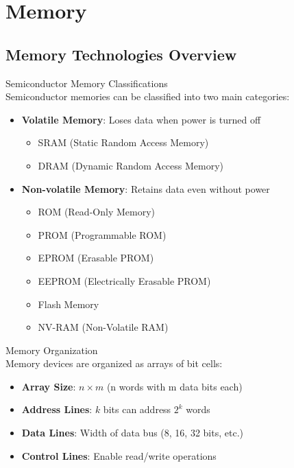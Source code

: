 \section{Memory}

\subsection{Memory Technologies Overview}

\begin{concept}{Semiconductor Memory Classifications}\\
Semiconductor memories can be classified into two main categories:
\begin{itemize}
    \item \textbf{Volatile Memory}: Loses data when power is turned off
    \begin{itemize}
        \item SRAM (Static Random Access Memory)
        \item DRAM (Dynamic Random Access Memory)
    \end{itemize}
    \item \textbf{Non-volatile Memory}: Retains data even without power
    \begin{itemize}
        \item ROM (Read-Only Memory)
        \item PROM (Programmable ROM)
        \item EPROM (Erasable PROM)
        \item EEPROM (Electrically Erasable PROM)
        \item Flash Memory
        \item NV-RAM (Non-Volatile RAM)
    \end{itemize}
\end{itemize}
\end{concept}

\begin{definition}{Memory Organization}\\
Memory devices are organized as arrays of bit cells:
\begin{itemize}
    \item \textbf{Array Size}: $n \times m$ (n words with m data bits each)
    \item \textbf{Address Lines}: $k$ bits can address $2^k$ words
    \item \textbf{Data Lines}: Width of data bus (8, 16, 32 bits, etc.)
    \item \textbf{Control Lines}: Enable read/write operations
\end{itemize}
\end{definition}

